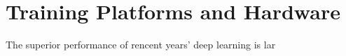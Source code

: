 \section{Training Platforms and Hardware}
The superior performance of rencent years' deep learning is lar